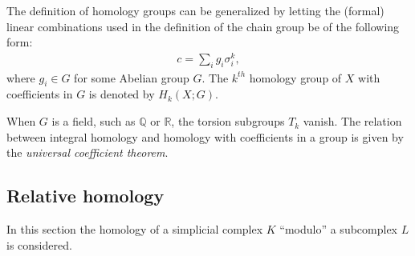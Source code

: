     \begin{construct}
        The definition of homology groups can be generalized by letting the (formal) linear combinations used in the definition of the chain group be of the following form:
        \begin{gather}
            c = \sum_ig_i\sigma_i^k,
        \end{gather}
        where $g_i\in G$ for some Abelian group $G$. The $k^{th}$ homology group of $X$ with coefficients in $G$ is denoted by $H_k(X;G)$.
    \end{construct}
    \begin{property}
        When $G$ is a field, such as $\mathbb{Q}$ or $\mathbb{R}$, the torsion subgroups $T_k$ vanish. The relation between integral homology and homology with coefficients in a group is given by the \textit{universal coefficient theorem}.
    \end{property}


\subsection{Relative homology}

    In this section the homology of a simplicial complex $K$ ``modulo'' a subcomplex $L$ is considered.

